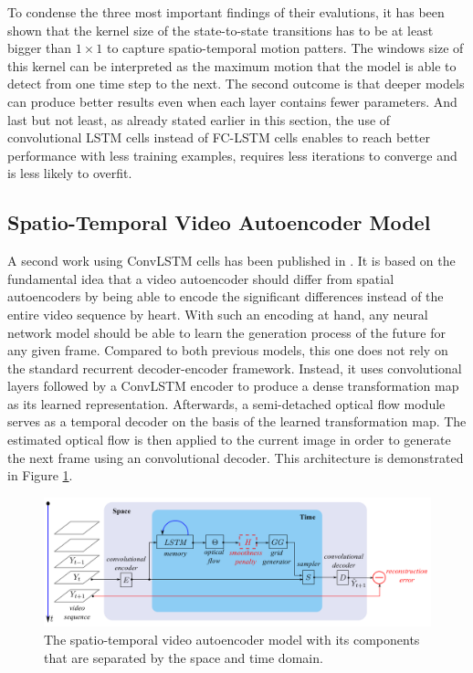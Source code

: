 To condense the three most important findings of their evalutions, it has been shown that the kernel size of the state-to-state transitions has to be at least bigger than $1 \times 1$ to capture spatio-temporal motion patters. The windows size of this kernel can be interpreted as the maximum motion that the model is able to detect from one time step to the next. The second outcome is that deeper models can produce better results even when each layer contains fewer parameters. And last but not least, as already stated earlier in this section, the use of convolutional LSTM cells instead of FC-LSTM cells enables to reach better performance with less training examples, requires less iterations to converge and is less likely to overfit.


\subsection{Spatio-Temporal Video Autoencoder Model}

A second work using ConvLSTM cells has been published in \parencite{spat_temp_video_autoenc}. It is based on the fundamental idea that a video autoencoder should differ from spatial autoencoders by being able to encode the significant differences instead of the entire video sequence by heart. With such an encoding at hand, any neural network model should be able to learn the generation process of the future for any given frame. Compared to both previous models, this one does not rely on the standard recurrent decoder-encoder framework. Instead, it uses convolutional layers followed by a ConvLSTM encoder to produce a dense transformation map as its learned representation. Afterwards, a semi-detached optical flow module serves as a temporal decoder on the basis of the learned transformation map. The estimated optical flow is then applied to the current image in order to generate the next frame using an convolutional decoder. This architecture is demonstrated in Figure \ref{fig:spatiotemp_model}.

\begin{figure}[htb]
	\centering
	\includegraphics[width=0.9\linewidth]{figures/related/spat_temp_video.png} 
	\caption[Spatio-Temporal Video Autoencoder Model]{The spatio-temporal video autoencoder model with its components that are separated by the space and time domain.} \label{fig:spatiotemp_model}
\end{figure}


